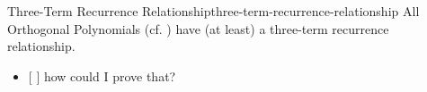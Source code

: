 \begin{definition}{Three-Term Recurrence Relationship}{three-term-recurrence-relationship}
  All Orthogonal Polynomials (cf. ) have (at least) a three-term
  recurrence relationship.

  \begin{itemize}
    \tightlist
    \item
          {[} {]} how could I prove that?
  \end{itemize}
\end{definition}
